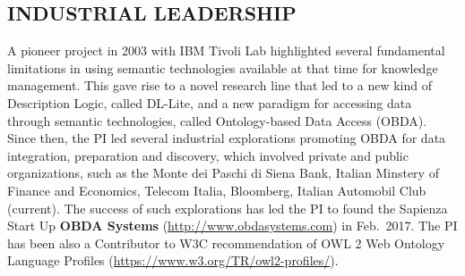 \vspace{-3ex}
\subsection*{INDUSTRIAL LEADERSHIP}
\vspace{-3ex}

A pioneer project in 2003 with IBM Tivoli Lab highlighted several fundamental limitations in using semantic technologies available at that time for knowledge management. This gave rise to a novel research line that led to a new kind of Description Logic, called DL-Lite, and a new paradigm for accessing data through semantic technologies, called Ontology-based Data Access (OBDA). Since then, the PI led several industrial explorations promoting OBDA for data integration, preparation and discovery, which involved private and public organizations, such as the Monte dei Paschi di Siena Bank, Italian Minstery of Finance and Economics, Telecom Italia, Bloomberg, Italian Automobil Club (current). The success of such explorations has led the PI to found the Sapienza Start Up \textbf{OBDA Systems} (\url{http://www.obdasystems.com}) in Feb.\ 2017. The PI has been also a Contributor to W3C  recommendation of  OWL 2 Web Ontology Language 
Profiles (\url{https://www.w3.org/TR/owl2-profiles/}).



